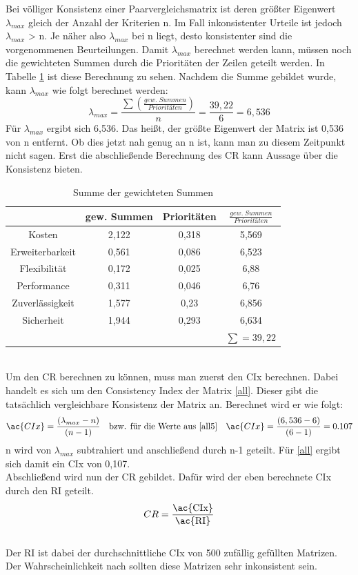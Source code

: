 Bei völliger Konsistenz einer Paarvergleichsmatrix ist deren größter Eigenwert $\lambda_{max}$ gleich der Anzahl der Kriterien n. Im Fall inkonsistenter Urteile ist jedoch $\lambda_{max}$ > n. Je näher also $\lambda_{max}$ bei n liegt, desto konsistenter sind die vorgenommenen Beurteilungen. Damit $\lambda_{max}$ berechnet werden kann, müssen noch die gewichteten Summen durch die Prioritäten der Zeilen geteilt werden. In Tabelle \ref{all5} ist diese Berechnung zu sehen. Nachdem die Summe gebildet wurde, kann $\lambda_{max}$ wie folgt berechnet werden:
\[\lambda_{max}=\frac{\sum(\frac{gew.\; Summen}{Prioritäten})}{n}=\frac{39,22}{6}=6,536\]
Für $\lambda_{max}$ ergibt sich 6,536. Das heißt, der größte Eigenwert der Matrix ist 0,536 von n entfernt. Ob dies jetzt nah genug an n ist, kann man zu diesem Zeitpunkt nicht sagen. Erst die abschließende Berechnung des \ac{CR} kann Aussage über die Konsistenz bieten.\\
\begin{table}[h!]
	\centering
	\begin{tabular}{c|c|c|c}
		&gew. Summen&Prioritäten&$\frac{gew.\; Summen}{Prioritäten}$\\ 
		\hline
		Kosten          &        2,122&0,318& 5,569\\
		Erweiterbarkeit &     0,561&0,086& 6,523\\
		Flexibilität    &   0,172&0,025&6,88\\		
		Performance     &    0,311 &0,046&6,76 \\		
		Zuverlässigkeit &     1,577& 0,23&6,856\\		
		Sicherheit      &  1,944&0,293&6,634\\
		\hline
			& & &$\sum=39,22$
	\end{tabular}
	\caption{Summe der gewichteten Summen}
	\label{all5}
\end{table}\\
Um den \ac{CR} berechnen zu können, muss man zuerst den \ac{CIx} berechnen. Dabei handelt es sich um den Consistency Index der Matrix \ref{all}. Dieser gibt die tatsächlich vergleichbare Konsistenz der Matrix an. Berechnet wird er wie folgt:
\[\ac{CIx}=\frac{(\lambda_{max}-n)}{(n-1)}\quad \mbox{bzw. für die Werte aus \ref{all5}}\quad \ac{CIx}=\frac{(6,536-6)}{(6-1)}=0.107\]
n wird von $\lambda_{max}$ subtrahiert und anschließend durch n-1 geteilt. Für \ref{all} ergibt sich damit ein \ac{CIx} von 0,107.\\
Abschließend wird nun der \ac{CR} gebildet. Dafür wird der eben berechnete \ac{CIx} durch den \ac{RI} geteilt.\[CR=\frac{\mbox{\ac{CIx}}}{\mbox{\ac{RI}}}\]\\ Der RI ist dabei der durchschnittliche \ac{CIx} von 500 zufällig gefüllten Matrizen. Der Wahrscheinlichkeit nach sollten diese Matrizen sehr inkonsistent sein.

